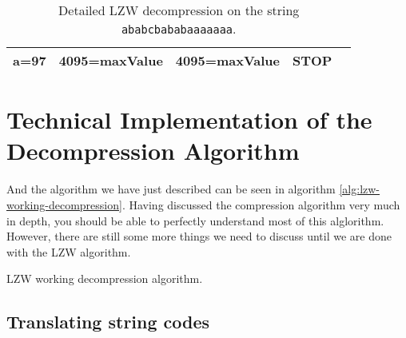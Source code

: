 \begin{refsection}
\begin{table}
{\begin{tabular}{lllll}
    a=97 & 4095=maxValue & 4095=maxValue & STOP &  \\

    \bottomrule
  \end{tabular}}
  \caption{Detailed LZW decompression on the string \texttt{ababcbababaaaaaaa}.}
  \label{tab:lzw-dec-walkthru}
\end{table}

\section{Technical Implementation of the Decompression Algorithm}

And the algorithm we have just described can be seen in algorithm
\ref{alg:lzw-working-decompression}. Having discussed the
compression algorithm very much in depth, you should be able to
perfectly understand most of this alglorithm. However, there are still
some more things we need to discuss until we are done with the LZW
algorithm.

\begin{algorithm}[H]
  \caption{LZW working decompression algorithm.}
  \label{alg:lzw-working-decompression}
  \begin{algorithmic}[1]
    \State {}



       
      \Else
      \EndIf

      \State {}

       

      \State {}



    \EndWhile
  \end{algorithmic}
\end{algorithm}

\subsection{Translating string codes}


\end{refsection}
